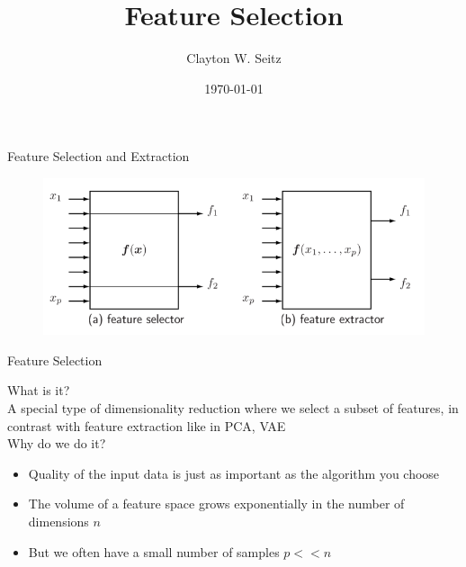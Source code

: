 \documentclass{beamer}					%
\title{Feature Selection}	%
\author{Clayton W. Seitz}								%
\date{\today}									%
\begin{document}
\begin{frame}
  \titlepage
\end{frame}

%

\begin{frame}{Feature Selection and Extraction}

\begin{center}
\begin{figure}
\includegraphics[width=1.0\textwidth]{features.png}
\end{figure}
\end{center}
\end{frame}

\begin{frame}{Feature Selection}

What is it?\\
\vspace{0.2in}
A special type of dimensionality reduction where we select a subset of features, in contrast with feature extraction like in PCA, VAE\\
\vspace{0.2in}
Why do we do it? \\
\vspace{0.2in}
\begin{itemize}
\item Quality of the input data is just as important as the algorithm you choose
\item The volume of a feature space grows exponentially in the number of dimensions $n$
\item But we often have a small number of samples $p<<n$
\end{itemize}

\end{frame}
\end{document}
